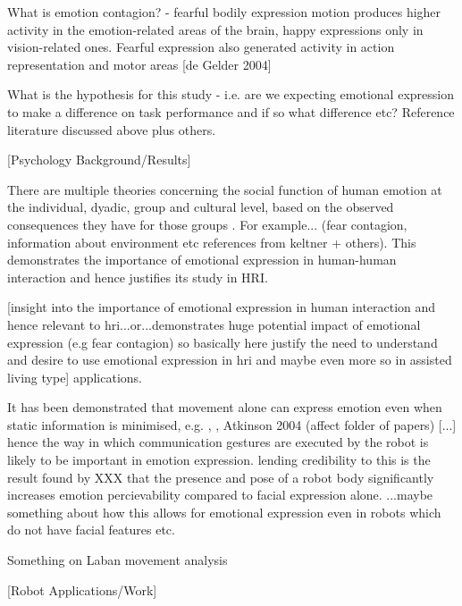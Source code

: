 \documentclass[11pt]{article}
\begin{document}
What is emotion contagion?
- fearful bodily expression motion produces higher activity in the emotion-related areas of the brain, happy expressions only in vision-related ones. Fearful expression also generated activity in action representation and motor areas [de Gelder 2004]

What is the hypothesis for this study - i.e. are we expecting emotional expression to make a difference on task performance and if so what difference etc? Reference literature discussed above plus others. 

[Psychology Background/Results]

There are multiple theories concerning the social function of human emotion at the individual, dyadic, group and cultural level, based on the observed consequences they have for those groups \cite{keltner1999social}. For example... (fear contagion, information about environment etc references from keltner + others). This demonstrates the importance of emotional expression in human-human interaction and hence justifies its study in HRI. 

[insight into the importance of emotional expression in human interaction and hence relevant to hri...or...demonstrates huge potential impact of emotional expression (e.g fear contagion) so basically here justify the need to understand and desire to use emotional expression in hri and maybe even more so in assisted living type] applications.

It has been demonstrated that movement alone can express emotion even when static information is minimised, e.g. \cite{dittrich1996perception}, \cite{pollick2001perceiving}, Atkinson 2004 (affect folder of papers) [...] hence the way in which communication gestures are executed by the robot is likely to be important in emotion expression. lending credibility to this is the result found by XXX that the presence and pose of a robot body significantly increases emotion percievability compared to facial expression alone. ...maybe something about how this allows for emotional expression even in robots which do not have facial features etc.  

Something on Laban movement analysis

[Robot Applications/Work]
\end{document}
